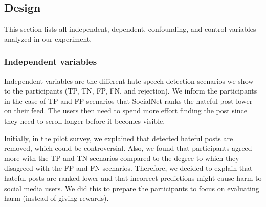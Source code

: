 \subsection{Design}
This section lists all independent, dependent, confounding, and control variables analyzed in our experiment.

\subsubsection{Independent variables}
Independent variables are the different hate speech detection scenarios we show to the participants (TP, TN, FP, FN, and rejection).
%
We inform the participants in the case of TP and FP scenarios that SocialNet ranks the hateful post lower on their feed.
%
The users then need to spend more effort finding the post since they need to scroll longer before it becomes visible.
%

%
Initially, in the pilot survey, we explained that detected hateful posts are removed, which could be controversial.
%
Also, we found that participants agreed more with the TP and TN scenarios compared to the degree to which they disagreed with the FP and FN scenarios.
%
Therefore, we decided to explain that hateful posts are ranked lower and that incorrect predictions might cause harm to social media users.
%
We did this to prepare the participants to focus on evaluating harm (instead of giving rewards).
%

